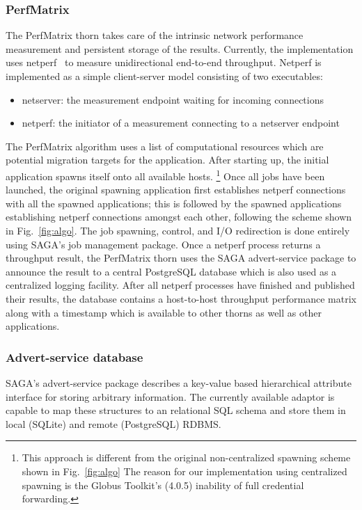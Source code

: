 \documentclass[conference,final]{IEEEtran}
\begin{document}
\subsubsection{PerfMatrix} The PerfMatrix thorn takes care of the
intrinsic network performance measurement and persistent storage of
the results. Currently, the implementation uses
netperf~\cite{netperf_web} to measure unidirectional end-to-end
throughput. Netperf is implemented as a simple client-server model
consisting of two executables:
\begin{itemize}
\item{netserver: the measurement endpoint waiting for incoming connections}
\item{netperf: the initiator of a measurement connecting to a netserver endpoint}
\end{itemize}

The PerfMatrix algorithm uses a list of computational resources which
are potential migration targets for the application. After starting
up, the initial application spawns itself onto all available hosts.
\footnote{This approach is different from the original non-centralized
  spawning scheme shown in Fig.~\ref{fig:algo} The reason for our
  implementation using centralized spawning is the Globus Toolkit's
  (4.0.5) inability of full credential forwarding.} Once all jobs have
been launched, the original spawning application first establishes
netperf connections with all the spawned applications; this is
followed by the spawned applications establishing netperf connections
amongst each other, following the scheme shown in Fig.~\ref{fig:algo}.
The job spawning, control, and I/O redirection is done entirely using
SAGA's job management package.  Once a netperf process returns a
throughput result, the PerfMatrix thorn uses the SAGA advert-service
package to announce the result to a central PostgreSQL database which
is also used as a centralized logging facility. After all netperf
processes have finished and published their results, the database
contains a host-to-host throughput performance matrix along with a
timestamp which is available to other thorns as well as other
applications.

\subsubsection{Advert-service database} SAGA's advert-service package
describes a key-value based hierarchical attribute interface for
storing arbitrary information. The currently available adaptor is
capable to map these structures to an relational SQL schema and store
them in local (SQLite) and remote (PostgreSQL) RDBMS.
\end{document}
